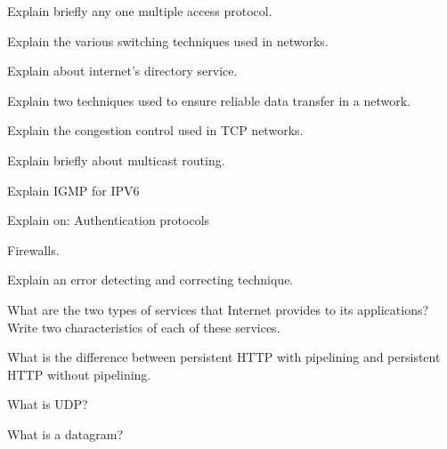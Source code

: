 \item Explain briefly any one multiple access protocol.

\markB

\partC

\item Explain the various switching techniques used in networks.

\Or

\item Explain about internet's directory service.

\newpage \again

\item Explain two techniques used to ensure reliable data transfer in a
  network.

\Or

\item Explain the congestion control used in TCP networks.

\item Explain briefly about multicast routing.

\Or

\item Explain IGMP for IPV6

\item Explain on:
  \iitem Authentication protocols
  \item Firewalls.
  \ene

\Or

\item Explain  an error detecting and correcting technique.

\markC

\ene

\newpage



\sub{\subj}

\maxtime


\partA


\iitem What are the two types of services that Internet provides  to its applications? Write two characteristics of each of these services.

\item What is the difference between persistent HTTP with pipelining and persistent HTTP without pipelining.

\item What is UDP?

\item What is a datagram?

